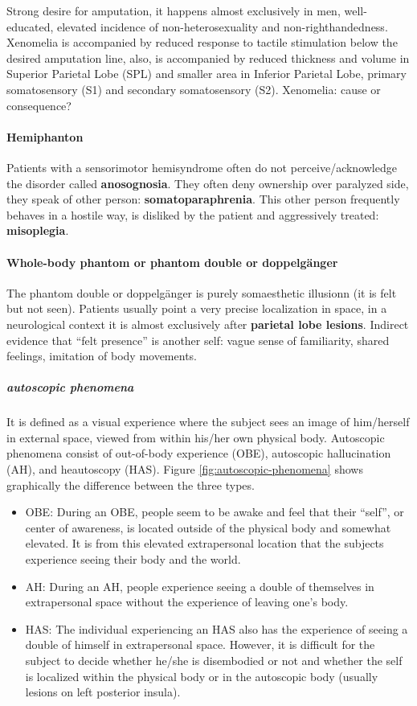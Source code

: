 \documentclass[12pt,article,oneside,a4paper]{memoir}
\begin{document}
Strong desire for amputation, it happens almost exclusively in men, well-educated, elevated incidence of non-heterosexuality and non-righthandedness. Xenomelia is accompanied by reduced response to tactile stimulation below the desired amputation line, also, is accompanied by reduced thickness and volume in Superior Parietal Lobe (SPL) and smaller area in Inferior Parietal Lobe, primary somatosensory (S1) and secondary somatosensory (S2).
Xenomelia: cause or consequence?

\paragraph{Hemiphanton} Patients with a sensorimotor hemisyndrome often do not perceive/acknowledge the disorder called \textbf{anosognosia}. They often deny ownership over paralyzed side, they speak of other person: \textbf{somatoparaphrenia}. This other person frequently behaves in a hostile way, is disliked by the patient and aggressively treated: \textbf{misoplegia}.

\paragraph{Whole-body phantom or phantom double or doppelg\"anger} The phantom double or doppelg\"anger is purely somaesthetic illusionn (it is felt but not seen). Patients usually point a very precise localization in space, in a neurological context it is almost exclusively after \textbf{parietal lobe lesions}. Indirect evidence that ``felt presence'' is another self: vague sense of familiarity, shared feelings, imitation of body movements.
\subparagraph{autoscopic phenomena} It is defined as a visual experience where the subject sees an image of him/herself in external space, viewed from within his/her own physical body.
Autoscopic phenomena consist of out-of-body experience (OBE), autoscopic hallucination (AH), and heautoscopy (HAS). Figure \ref{fig:autoscopic-phenomena} shows graphically the difference between the three types.
\begin{itemize}
\item OBE: During an OBE, people seem to be awake and feel that their ``self'', or center of awareness, is located outside of the physical body and somewhat elevated. It is from this elevated extrapersonal location that the subjects experience seeing their body and the world.
\item AH: During an AH, people experience seeing a double of themselves in extrapersonal space without the experience of leaving one's body.
\item HAS: The individual experiencing an HAS also has the experience of seeing a double of himself in extrapersonal space. However, it is difficult for the subject to decide whether he/she is disembodied or not and whether the self is localized within the physical body or in the autoscopic body (usually lesions on left posterior insula).
\end{itemize}
\end{document}
